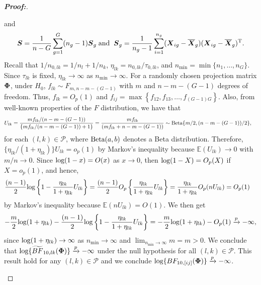 \documentclass[times,sort&compress,3p]{elsarticle}
\theoremstyle{plain}%
\theoremstyle{definition}
\def\log{\hbox{log}}
\def\Beta{\hbox{Beta}}
\def\log{\hbox{log}}
\def\Beta{\hbox{Beta}}
\def\bse{\begin{eqnarray*}}
\def\ese{\end{eqnarray*}}
\def\trans{^{\rm T}}
\newcommand{\uS}       {\mbox{\boldmath$S$}}
\newcommand{\uX}       {\mbox{\boldmath$X$}}
\newcommand{\uPhi}              {\mbox{\boldmath$\Phi$}}
\newcommand{\rsz}[1]{\textcolor{red}{#1}}
\begin{document}
\begin{proof}[\textbf{\upshape Proof:}]
\begin{description}
and $$ \uS = \frac{1}{n - G} \sum^{G}_{g=1}(n_g -1)\uS_{g}\; \text{and} \;\; \uS_g = \frac{1}{n_g - 1}\sum^{n_g}_{i=1}(\uX_{ig} - \overline{\uX}_{g})(\uX_{ig} - \overline{\uX}_{g})\trans.$$
Recall that $1/n_{0,lk} = 1/n_l + 1/n_k$, $\eta_{lk} = n_{0,lk}/\tau_{0,lk}$, and $n_{\min} = \min\{n_1, \ldots, n_G\}$.
Since $\tau_{lk}$ is fixed, $\eta_{lk} \rightarrow \infty$ as $n_{\min} \to \infty$.
For a randomly chosen projection matrix $\uPhi$, under $H_{0}$, $f_{lk}  \sim F_{m, n-m-(G-1)}$ with $m$ and $n - m -(G-1)$ degrees of freedom.
Thus, $f_{lk} = O_{p}(1)$ and $f_{ij} = \max\left\{f_{12}, f_{13}, \ldots, f_{(G-1)G} \right\}$.
Also, from well-known properties of the $F$ distribution, we have that
\begin{align*}
U_{lk} & = \frac{m f_{lk}/(n-m-(G-1) )}{\{m f_{lk}/(n-m- (G-1) ) + 1\}} 
  =\frac{m f_{lk}}{( m f_{lk} +n-m- (G-1))} \sim \Beta\{m/2, (n-m-(G-1))/2 \},
\end{align*}
for each {$(l, k)\in\mathcal{P}$}, where $\Beta(a, b)$ denotes a Beta distribution.
Therefore, $\{\eta_{lk}/(1 + \eta_{lk})\} U_{lk} = o_{p}(1)$ by Markov's inequality because $\mathbb{E}(U_{lk}) \to 0$ with $m/n\to 0$.
Since $\log(1 - x) = O(x)$ as $x\to 0$, then $\log(1 - X) = O_p(X)$ if $X = o_p(1)$, and hence,
\begin{align*}
    \frac{(n - 1)}{2}\log\left\{1 - \frac{\eta_{lk}}{1 + \eta_{lk}}U_{lk}\right\}
    & = \frac{(n - 1)}{2}O_p\left\{\frac{\eta_{lk}}{1 + \eta_{lk}}U_{lk}\right\} = \frac{\eta_{lk}}{1 + \eta_{lk}}O_p(nU_{lk}) = O_p(1)
\end{align*}
by Markov's inequality because $\mathbb{E}(nU_{lk}) = O(1)$. 
We then get
\bse
-\frac{m}{2}\log(1 + \eta_{lk}) -\frac{(n-1)}{2}\log\left\{1 - \frac{\eta_{lk}}{1 + \eta_{lk}}U_{lk}\right\}
= -\frac{m}{2}\log(1 + \eta_{lk}) - O_p(1) \xrightarrow[]{p} -\infty,
\ese
since $\log(1 + \eta_{lk}) \rightarrow \infty$ as $n_{\min} \rightarrow \infty$ and $\lim_{n_{\min} \rightarrow \infty} m = m > 0$.
We conclude that $\log\{\widetilde{BF}_{10,lk}(\uPhi)\} \xrightarrow[]{p} -\infty$ under the null hypothesis for all $(l, k)\in\mathcal{P}$.
This result hold for any $(l,k) \in \mathcal{P}$ and we conclude $\log\{BF_{10,[ij]}(\uPhi)\} \xrightarrow[]{p} -\infty$. 


\end{description}
\end{proof}
\end{document}
